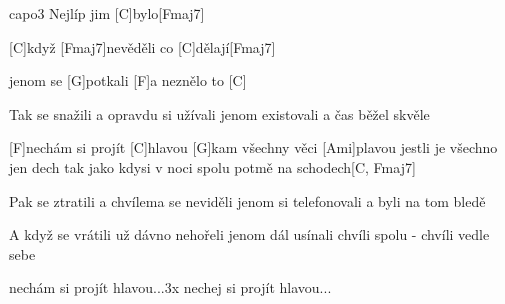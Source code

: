 \hfill capo3
Nejlíp jim [C]bylo[Fmaj7]

[C]když [Fmaj7]nevěděli co [C]dělají[Fmaj7]

jenom se [G]potkali
[F]a neznělo to [C]


Tak se snažili
a opravdu si užívali
jenom existovali
a čas běžel skvěle

[F]nechám si projít [C]hlavou
[G]kam všechny věci [Ami]plavou
jestli je všechno jen dech
tak jako kdysi v noci
spolu potmě na schodech[C, Fmaj7]

Pak se ztratili
a chvílema se neviděli
jenom si telefonovali
a byli na tom bledě

A když se vrátili
už dávno nehořeli
jenom dál usínali
chvíli spolu - chvíli vedle sebe

nechám si projít hlavou...3x
nechej si projít hlavou...



